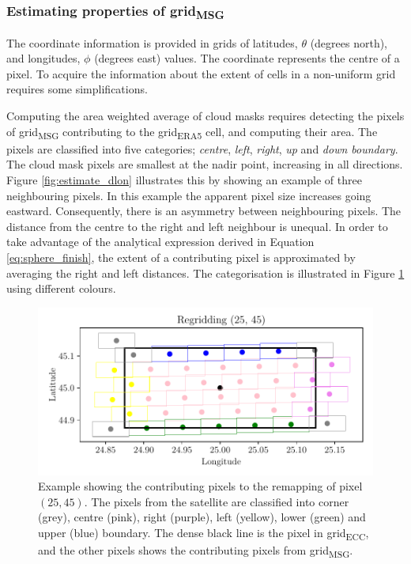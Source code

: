 \subsubsection{Estimating properties of grid\textsubscript{MSG}}
The coordinate information is provided in grids of latitudes, $\theta$ (degrees north), and longitudes, $\phi$ (degrees east) values. The coordinate represents the centre of a pixel. To acquire the information about the extent of cells in a non-uniform grid requires some simplifications. 

Computing the area weighted average of cloud masks requires detecting the pixels of grid\textsubscript{MSG}
contributing to the grid\textsubscript{ERA5} cell, and computing their area. The pixels are classified into five categories; \textit{centre}, \textit{left}, \textit{right}, \textit{up} and \textit{down boundary}.
The cloud mask pixels are smallest at the nadir point, increasing in all directions. Figure \ref{fig:estimate_dlon} illustrates this by showing an example of three neighbouring pixels. In this example the apparent pixel size increases going eastward. Consequently, there is an asymmetry between neighbouring pixels. The distance from the centre to the right and left neighbour is unequal. In order to take advantage of the analytical expression derived in Equation \eqref{eq:sphere_finish}, the extent of a contributing pixel is approximated by averaging the right and left distances. The categorisation is illustrated in Figure \ref{fig:pixels_contributing_to_cell} using different colours.

\begin{figure}
    \centering
    \includegraphics{python_figs/example_remapping_lat45_lon25.pdf}
    \caption{Example showing the contributing pixels to the remapping of pixel $(25, 45)$. The pixels from the satellite are classified into corner (grey), centre (pink), right (purple), left (yellow), lower (green) and upper (blue) boundary. The dense black line is the pixel in grid\textsubscript{ECC}, and the other pixels shows the contributing pixels from grid\textsubscript{MSG}.}
    \label{fig:pixels_contributing_to_cell}
\end{figure}

